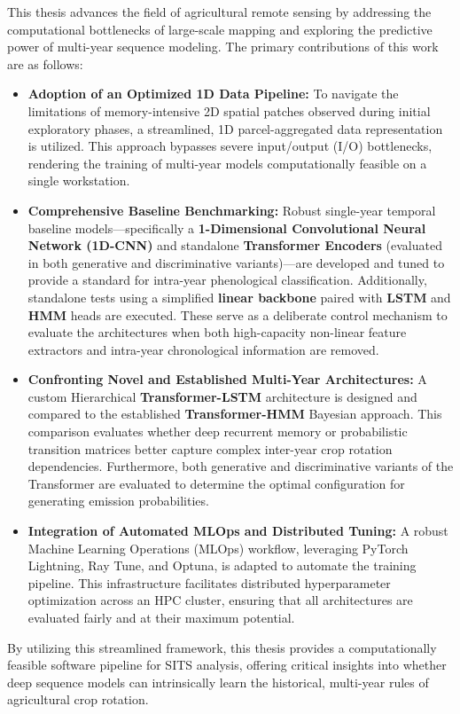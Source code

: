This thesis advances the field of agricultural remote sensing by addressing the computational bottlenecks of large-scale mapping
and exploring the predictive power of multi-year sequence modeling. The primary contributions of this work are as follows:

\begin{itemize}
    \item \textbf{Adoption of an Optimized 1D Data Pipeline:}
        To navigate the limitations of memory-intensive 2D spatial patches observed during initial exploratory phases,
        a streamlined, 1D parcel-aggregated data representation is utilized. 
        This approach bypasses severe input/output (I/O) bottlenecks, rendering the training of multi-year models computationally feasible on a single workstation.
    
    \item \textbf{Comprehensive Baseline Benchmarking:}
        Robust single-year temporal baseline models---specifically a \textbf{1-Dimensional Convolutional Neural Network (1D-CNN)}
        and standalone \textbf{Transformer Encoders} (evaluated in both generative and discriminative variants)---are developed and
        tuned to provide a standard for intra-year phenological classification.
        Additionally, standalone tests using a simplified \textbf{linear backbone} paired with \textbf{LSTM} and \textbf{HMM} heads are executed.
        These serve as a deliberate control mechanism to evaluate the architectures when both high-capacity non-linear feature extractors
        and intra-year chronological information are removed.
    
    \item \textbf{Confronting Novel and Established Multi-Year Architectures:}
        A custom Hierarchical \textbf{Transformer-LSTM} architecture is designed and compared to the established \textbf{Transformer-HMM} Bayesian approach.
        This comparison evaluates whether deep recurrent memory or probabilistic transition matrices better capture complex inter-year crop rotation dependencies.
        Furthermore, both generative and discriminative variants of the Transformer are evaluated to determine the optimal configuration for generating emission probabilities.
    
    \item \textbf{Integration of Automated MLOps and Distributed Tuning:}
        A robust Machine Learning Operations (MLOps) workflow, leveraging PyTorch Lightning, Ray Tune, and Optuna, 
        is adapted to automate the training pipeline. This infrastructure facilitates distributed hyperparameter optimization 
        across an HPC cluster, ensuring that all architectures are evaluated fairly and at their maximum potential.
\end{itemize}

By utilizing this streamlined framework, this thesis provides a computationally feasible software pipeline for SITS analysis,
offering critical insights into whether deep sequence models can intrinsically learn the historical, multi-year rules of agricultural crop rotation.